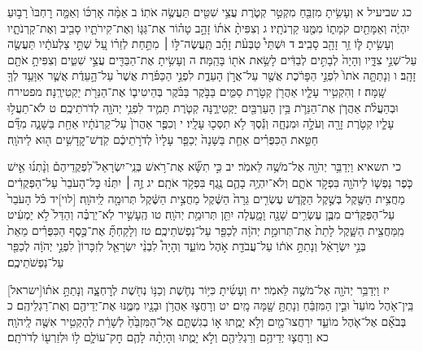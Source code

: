 \documentclass[twoside, openany, parskip=half, 11pt]{book}
\begin{document}
כג שביעיל א וְעָשִׂ֥יתָ מִזְבֵּ֖חַ מִקְטַ֣ר קְטֹ֑רֶת עֲצֵ֥י שִׁטִּ֖ים תַּעֲשֶׂ֥ה אֹתֽוֹ׃ ב אַמָּ֨ה אׇרְכּ֜וֹ וְאַמָּ֤ה רׇחְבּוֹ֙ רָב֣וּעַ יִהְיֶ֔ה וְאַמָּתַ֖יִם קֹמָת֑וֹ מִמֶּ֖נּוּ קַרְנֹתָֽיו׃ ג וְצִפִּיתָ֨ אֹת֜וֹ זָהָ֣ב טָה֗וֹר אֶת־גַּגּ֧וֹ וְאֶת־קִירֹתָ֛יו סָבִ֖יב וְאֶת־קַרְנֹתָ֑יו וְעָשִׂ֥יתָ לּ֛וֹ זֵ֥ר זָהָ֖ב סָבִֽיב׃ ד וּשְׁתֵּי֩ טַבְּעֹ֨ת זָהָ֜ב תַּֽעֲשֶׂה־לּ֣וֹ ׀ מִתַּ֣חַת לְזֵר֗וֹ עַ֚ל שְׁתֵּ֣י צַלְעֹתָ֔יו תַּעֲשֶׂ֖ה עַל־שְׁנֵ֣י צִדָּ֑יו וְהָיָה֙ לְבָתִּ֣ים לְבַדִּ֔ים לָשֵׂ֥את אֹת֖וֹ בָּהֵֽמָּה׃ ה וְעָשִׂ֥יתָ אֶת־הַבַּדִּ֖ים עֲצֵ֣י שִׁטִּ֑ים וְצִפִּיתָ֥ אֹתָ֖ם זָהָֽב׃ ו וְנָתַתָּ֤ה אֹתוֹ֙ לִפְנֵ֣י הַפָּרֹ֔כֶת אֲשֶׁ֖ר עַל־אֲרֹ֣ן הָעֵדֻ֑ת לִפְנֵ֣י הַכַּפֹּ֗רֶת אֲשֶׁר֙ עַל־הָ֣עֵדֻ֔ת אֲשֶׁ֛ר אִוָּעֵ֥ד לְךָ֖ שָֽׁמָּה׃ ז וְהִקְטִ֥יר עָלָ֛יו אַהֲרֹ֖ן קְטֹ֣רֶת סַמִּ֑ים בַּבֹּ֣קֶר בַּבֹּ֗קֶר בְּהֵיטִיב֛וֹ אֶת־הַנֵּרֹ֖ת יַקְטִירֶֽנָּה׃ מפטירח וּבְהַעֲלֹ֨ת אַהֲרֹ֧ן אֶת־הַנֵּרֹ֛ת בֵּ֥ין הָעַרְבַּ֖יִם יַקְטִירֶ֑נָּה קְטֹ֧רֶת תָּמִ֛יד לִפְנֵ֥י יְהֹוָ֖ה לְדֹרֹתֵיכֶֽם׃ ט לֹא־תַעֲל֥וּ עָלָ֛יו קְטֹ֥רֶת זָרָ֖ה וְעֹלָ֣ה וּמִנְחָ֑ה וְנֵ֕סֶךְ לֹ֥א תִסְּכ֖וּ עָלָֽיו׃ י וְכִפֶּ֤ר אַהֲרֹן֙ עַל־קַרְנֹתָ֔יו אַחַ֖ת בַּשָּׁנָ֑ה מִדַּ֞ם חַטַּ֣את הַכִּפֻּרִ֗ים אַחַ֤ת בַּשָּׁנָה֙ יְכַפֵּ֤ר עָלָיו֙ לְדֹרֹ֣תֵיכֶ֔ם קֹֽדֶשׁ־קׇדָשִׁ֥ים ה֖וּא לַיהֹוָֽה׃

כי תשאיא וַיְדַבֵּ֥ר יְהֹוָ֖ה אֶל־מֹשֶׁ֥ה לֵּאמֹֽר׃ יב כִּ֣י תִשָּׂ֞א אֶת־רֹ֥אשׁ בְּנֵֽי־יִשְׂרָאֵל֮ לִפְקֻדֵיהֶם֒ וְנָ֨תְנ֜וּ אִ֣ישׁ כֹּ֧פֶר נַפְשׁ֛וֹ לַיהֹוָ֖ה בִּפְקֹ֣ד אֹתָ֑ם וְלֹא־יִהְיֶ֥ה בָהֶ֛ם נֶ֖גֶף בִּפְקֹ֥ד אֹתָֽם׃ יג זֶ֣ה ׀ יִתְּנ֗וּ כׇּל־הָעֹבֵר֙ עַל־הַפְּקֻדִ֔ים מַחֲצִ֥ית הַשֶּׁ֖קֶל בְּשֶׁ֣קֶל הַקֹּ֑דֶשׁ עֶשְׂרִ֤ים גֵּרָה֙ הַשֶּׁ֔קֶל מַחֲצִ֣ית הַשֶּׁ֔קֶל תְּרוּמָ֖ה לַֽיהֹוָֽה׃ [לוי]יד כֹּ֗ל הָעֹבֵר֙ עַל־הַפְּקֻדִ֔ים מִבֶּ֛ן עֶשְׂרִ֥ים שָׁנָ֖ה וָמָ֑עְלָה יִתֵּ֖ן תְּרוּמַ֥ת יְהֹוָֽה׃ טו הֶֽעָשִׁ֣יר לֹֽא־יַרְבֶּ֗ה וְהַדַּל֙ לֹ֣א יַמְעִ֔יט מִֽמַּחֲצִ֖ית הַשָּׁ֑קֶל לָתֵת֙ אֶת־תְּרוּמַ֣ת יְהֹוָ֔ה לְכַפֵּ֖ר עַל־נַפְשֹׁתֵיכֶֽם׃ טז וְלָקַחְתָּ֞ אֶת־כֶּ֣סֶף הַכִּפֻּרִ֗ים מֵאֵת֙ בְּנֵ֣י יִשְׂרָאֵ֔ל וְנָתַתָּ֣ אֹת֔וֹ עַל־עֲבֹדַ֖ת אֹ֣הֶל מוֹעֵ֑ד וְהָיָה֩ לִבְנֵ֨י יִשְׂרָאֵ֤ל לְזִכָּרוֹן֙ לִפְנֵ֣י יְהֹוָ֔ה לְכַפֵּ֖ר עַל־נַפְשֹׁתֵיכֶֽם׃

[ישראל]יז וַיְדַבֵּ֥ר יְהֹוָ֖ה אֶל־מֹשֶׁ֥ה לֵּאמֹֽר׃ יח וְעָשִׂ֜יתָ כִּיּ֥וֹר נְחֹ֛שֶׁת וְכַנּ֥וֹ נְחֹ֖שֶׁת לְרׇחְצָ֑ה וְנָתַתָּ֣ אֹת֗וֹ בֵּֽין־אֹ֤הֶל מוֹעֵד֙ וּבֵ֣ין הַמִּזְבֵּ֔חַ וְנָתַתָּ֥ שָׁ֖מָּה מָֽיִם׃ יט וְרָחֲצ֛וּ אַהֲרֹ֥ן וּבָנָ֖יו מִמֶּ֑נּוּ אֶת־יְדֵיהֶ֖ם וְאֶת־רַגְלֵיהֶֽם׃ כ בְּבֹאָ֞ם אֶל־אֹ֧הֶל מוֹעֵ֛ד יִרְחֲצוּ־מַ֖יִם וְלֹ֣א יָמֻ֑תוּ א֣וֹ בְגִשְׁתָּ֤ם אֶל־הַמִּזְבֵּ֙חַ֙ לְשָׁרֵ֔ת לְהַקְטִ֥יר אִשֶּׁ֖ה לַֽיהֹוָֽה׃ כא וְרָחֲצ֛וּ יְדֵיהֶ֥ם וְרַגְלֵיהֶ֖ם וְלֹ֣א יָמֻ֑תוּ וְהָיְתָ֨ה לָהֶ֧ם חׇק־עוֹלָ֛ם ל֥וֹ וּלְזַרְע֖וֹ לְדֹרֹתָֽם׃
\end{document}
